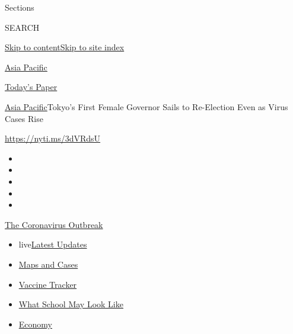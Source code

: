 Sections

SEARCH

\protect\hyperlink{site-content}{Skip to
content}\protect\hyperlink{site-index}{Skip to site index}

\href{https://www.nytimes3xbfgragh.onion/section/world/asia}{Asia
Pacific}

\href{https://myaccount.nytimes3xbfgragh.onion/auth/login?response_type=cookie\&client_id=vi}{}

\href{https://www.nytimes3xbfgragh.onion/section/todayspaper}{Today's
Paper}

\href{/section/world/asia}{Asia Pacific}\textbar{}Tokyo's First Female
Governor Sails to Re-Election Even as Virus Cases Rise

\url{https://nyti.ms/3dVRdsU}

\begin{itemize}
\item
\item
\item
\item
\item
\end{itemize}

\href{https://www.nytimes3xbfgragh.onion/news-event/coronavirus?action=click\&pgtype=Article\&state=default\&region=TOP_BANNER\&context=storylines_menu}{The
Coronavirus Outbreak}

\begin{itemize}
\tightlist
\item
  live\href{https://www.nytimes3xbfgragh.onion/2020/08/02/world/coronavirus-updates.html?action=click\&pgtype=Article\&state=default\&region=TOP_BANNER\&context=storylines_menu}{Latest
  Updates}
\item
  \href{https://www.nytimes3xbfgragh.onion/interactive/2020/us/coronavirus-us-cases.html?action=click\&pgtype=Article\&state=default\&region=TOP_BANNER\&context=storylines_menu}{Maps
  and Cases}
\item
  \href{https://www.nytimes3xbfgragh.onion/interactive/2020/science/coronavirus-vaccine-tracker.html?action=click\&pgtype=Article\&state=default\&region=TOP_BANNER\&context=storylines_menu}{Vaccine
  Tracker}
\item
  \href{https://www.nytimes3xbfgragh.onion/interactive/2020/07/29/us/schools-reopening-coronavirus.html?action=click\&pgtype=Article\&state=default\&region=TOP_BANNER\&context=storylines_menu}{What
  School May Look Like}
\item
  \href{https://www.nytimes3xbfgragh.onion/live/2020/07/31/business/stock-market-today-coronavirus?action=click\&pgtype=Article\&state=default\&region=TOP_BANNER\&context=storylines_menu}{Economy}
\end{itemize}

